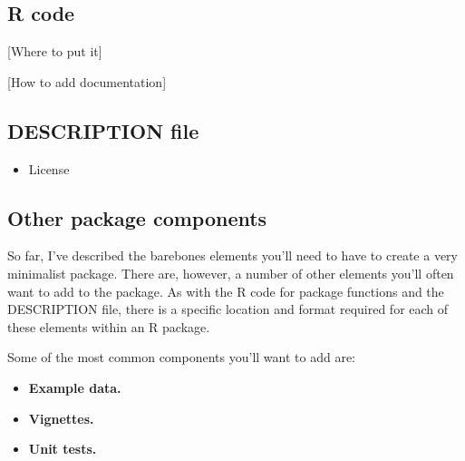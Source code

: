 \documentclass[]{tufte-book}
\providecommand{\tightlist}{%
  \setlength{\itemsep}{0pt}\setlength{\parskip}{0pt}}
\begin{document}
\hypertarget{r-code}{%
\subsection{R code}\label{r-code}}

{[}Where to put it{]}

{[}How to add documentation{]}

\hypertarget{description-file}{%
\subsection{DESCRIPTION file}\label{description-file}}

\begin{itemize}
\tightlist
\item
  License
\end{itemize}

\hypertarget{other-package-components}{%
\subsection{Other package components}\label{other-package-components}}

So far, I've described the barebones elements you'll need to have to create a very
minimalist package. There are, however, a number of other elements you'll often
want to add to the package. As with the R code for package functions and the
DESCRIPTION file, there is a specific location and format required for each of
these elements within an R package.

Some of the most common components you'll want to add are:

\begin{itemize}
\tightlist
\item
  \textbf{Example data.}
\item
  \textbf{Vignettes.}
\item
  \textbf{Unit tests.}
\end{itemize}
\end{document}
